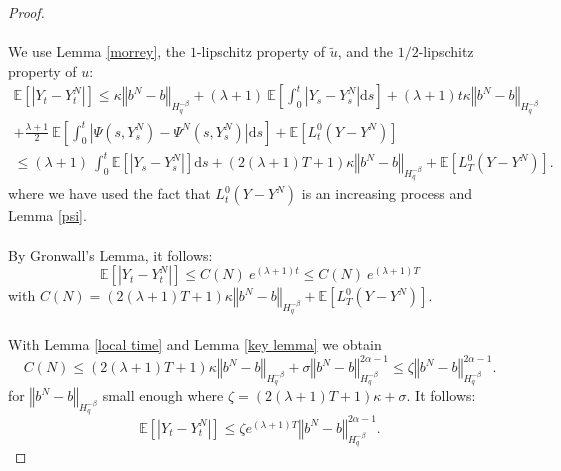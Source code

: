 \documentclass[11pt]{article}
\newcommand{\norme}[1]{\left\Vert #1\right\Vert}
\newcommand{\E}{\mathbb{E}}
\newcommand{\di}{\mathrm{d}}
\begin{document}
\begin{proof}
    \paragraph{}
    We use Lemma \ref{morrey}, the $1$-lipschitz property of $\widetilde{u}$, and the $1/2$-lipschitz property of $u$:
    \begin{multline*}
    \E\left[\left|Y_t-Y_t^N\right|\right]\leq \kappa\norme{b^N-b}_{H^{-\beta}_{q}} + (\lambda + 1)\ \E\left[\int_0^t\left|Y_s-Y_s^N\right| \di s\right] + (\lambda + 1)t\kappa\norme{b^N-b}_{H^{-\beta}_{q}}\\+ \frac{\lambda + 1}{2}\ \E\left[\int_0^t\left|\Psi\left(s,Y_s^N\right)-\Psi^N\left(s,Y_s^N\right)\right| \di s\right]  + \E \left[L_t^0(Y-Y^N)\right]
    \end{multline*}    
    \begin{multline*}
    \leq (\lambda + 1)\ \int_0^t\E\left[\left|Y_s-Y_s^N\right|\right] \di s + (2(\lambda + 1)T+1)\kappa\norme{b^N-b}_{H^{-\beta}_{q}}  + \E \left[L_T^0(Y-Y^N)\right].
    \end{multline*}
    where we have used the fact that $L_t^0(Y-Y^N)$ is an increasing process and Lemma \ref{psi}.    
    \paragraph{}
    By Gronwall's Lemma, it follows:
    \begin{equation}\label{gronwall}
    \E\left[\left|Y_t-Y_t^N\right|\right] \leq C(N)\ e^{(\lambda + 1)t}\leq C(N)\ e^{(\lambda + 1)T}
    \end{equation}
    with $C(N) = (2(\lambda + 1)T+1)\kappa\norme{b^N-b}_{H^{-\beta}_{q}}  + \E \left[L_T^0(Y-Y^N)\right].$      
    
    \paragraph{}
    With Lemma \ref{local time} and Lemma \ref{key lemma} we obtain \begin{equation*}
    C(N) \leq (2(\lambda + 1)T+1)\kappa\norme{b^N-b}_{H^{-\beta}_{q}}   + \sigma\norme{b^N-b}_{H^{-\beta}_{q}}^{2\alpha-1} \leq \zeta \norme{b^N-b}_{H^{-\beta}_{q}}^{2\alpha-1}.
    \end{equation*}   
    for $\norme{b^N-b}_{H^{-\beta}_{q}}$ small enough where $\zeta = (2(\lambda + 1)T+1)\kappa + \sigma $. It follows:
    \begin{equation}\label{gronfinal}
    \E\left[\left|Y_t-Y_t^N\right|\right] \leq \zeta e^{(\lambda + 1)T} \norme{b^N-b}_{H^{-\beta}_{q}}^{2\alpha-1}.
    \end{equation}
    

\end{proof}
\end{document}
